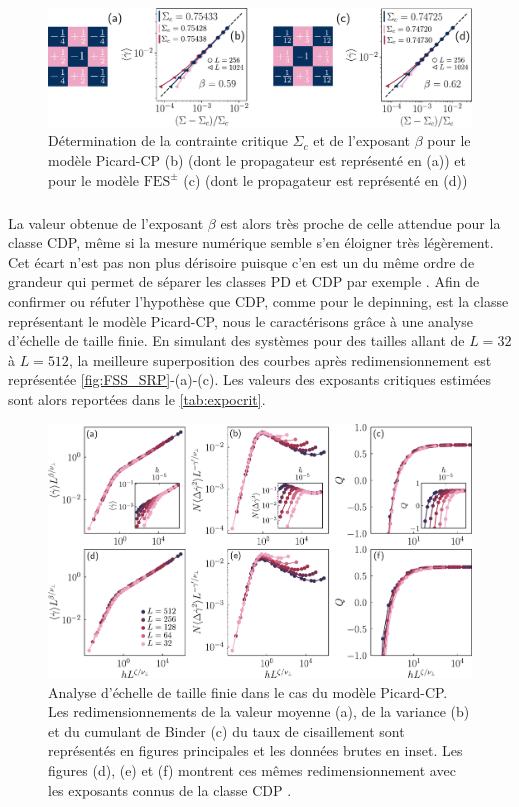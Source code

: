 \begin{figure}[h]
	\centering
	\includegraphics[width=\textwidth]{Chapitre4/Figures/CourtePortee/Prog_CP.pdf}
	\caption{Détermination de la contrainte critique $\Sigma_c$ et de l'exposant $\beta$ pour le modèle Picard-CP (b) (dont le propagateur est représenté en (a)) et pour le modèle $\text{FES}^\pm$ (c) (dont le propagateur est représenté en (d))}
	\label{fig:Prog_CP_SR}
\end{figure}

\subparagraph{}La valeur obtenue de l'exposant $\beta$ est alors très proche de celle attendue pour la classe CDP, même si la mesure numérique semble s'en éloigner très légèrement. Cet écart n'est pas non plus dérisoire puisque c'en est un du même ordre de grandeur qui permet de séparer les classes PD et CDP par exemple \cite{lubeck_universal_2004}. Afin de confirmer ou réfuter l'hypothèse que CDP, comme pour le depinning, est la classe représentant le modèle Picard-CP, nous le caractérisons grâce à une analyse d'échelle de taille finie. En simulant des systèmes pour des tailles allant de $L=32$ à $L=512$, la meilleure superposition des courbes après redimensionnement est représentée \autoref{fig:FSS_SRP}-(a)-(c). Les valeurs des exposants critiques estimées sont alors reportées dans le \autoref{tab:expocrit}.

\begin{figure}[h]
	\centering
	\includegraphics[width=\textwidth]{Chapitre4/Figures/CourtePortee/FSS_SRP_edited.pdf}
	\caption{Analyse d'échelle de taille finie dans le cas du modèle Picard-CP. Les redimensionnements de la valeur moyenne (a), de la variance (b) et du cumulant de Binder (c) du taux de cisaillement sont représentés en figures principales et les données brutes en inset. Les figures (d), (e) et (f) montrent ces mêmes redimensionnement avec les exposants connus de la classe CDP \cite{lubeck_universal_2004}.}
	\label{fig:FSS_SRP}
\end{figure}

